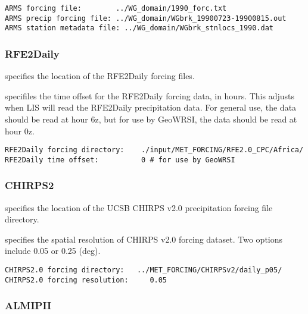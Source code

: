  \begin{Verbatim}[frame=single]
ARMS forcing file:        ../WG_domain/1990_forc.txt  
ARMS precip forcing file: ../WG_domain/WGbrk_19900723-19900815.out
ARMS station metadata file: ../WG_domain/WGbrk_stnlocs_1990.dat
 \end{Verbatim}
 

 
 \subsubsection{RFE2Daily} \label{sssec:supp_rfe2daily}
 

 
  specifies the location of the
 RFE2Daily forcing files.

  specifiles the time offset for the
 RFE2Daily forcing data, in hours.  This adjusts when LIS will
 read the RFE2Daily precipitation data.  For general use, the data
 should be read at hour 6z, but for use by GeoWRSI, the data should be
 read at hour 0z.
 

 \begin{Verbatim}[frame=single]
RFE2Daily forcing directory:    ./input/MET_FORCING/RFE2.0_CPC/Africa/
RFE2Daily time offset:          0 # for use by GeoWRSI
 \end{Verbatim}

 
 
 \subsubsection{CHIRPS2} \label{sssec:chirps2}
 

 
  specifies the location of the
 UCSB CHIRPS v2.0 precipitation forcing file directory.

  specifies the spatial resolution
 of CHIRPS v2.0 forcing dataset.  Two options include 0.05 or 0.25 (deg).
 

 \begin{Verbatim}[frame=single]
CHIRPS2.0 forcing directory:   ../MET_FORCING/CHIRPSv2/daily_p05/
CHIRPS2.0 forcing resolution:     0.05
 \end{Verbatim}
 

 
 
 \subsubsection{ALMIPII} \label{sssec:supp_almipii}
 

